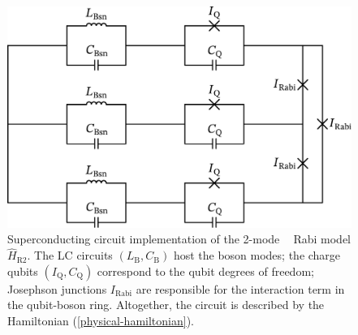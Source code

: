 \documentclass[reprint, aps, prx, amsmath, amssymb, longbibliography, superscriptaddress]{revtex4-2}
\DeclareMathOperator{\Zthree}{\mathbb{Z}_3}
\begin{document}
\begin{figure}[t]
  \includegraphics[width=\linewidth]{pics/SC_Rabi_circuit_svg-tex.pdf}
  \caption{Superconducting circuit implementation of the 2-mode $\Zthree$ Rabi model $\hat H_{\text{R}2}$. The LC circuits $(L_{\text{B}}, C_{\text{B}})$ host the boson modes; the charge qubits $(I_{\text{Q}}, C_{\text{Q}})$ correspond to the qubit degrees of freedom; Josephson junctions $I_{\text{Rabi}}$ are responsible for the interaction term in the qubit-boson ring. Altogether, the circuit is described by the Hamiltonian (\ref{physical-hamiltonian}).}
  \label{fig:superconducting-Rabi}
\end{figure}
\end{document}
